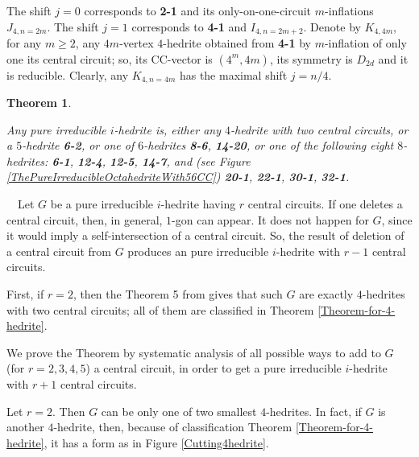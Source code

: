 \documentclass[12pt]{article}
\newtheorem{theorem}{Theorem}
\newcommand{\proof}{\noindent{\bf Proof.}\ \ }
\begin{document}
The shift $j=0$ corresponds to {\bf 2-1} and its only-on-one-circuit
$m$-inflations $J_{4,n=2m}$. The shift $j=1$ corresponds to {\bf 4-1} and 
$I_{4,n=2m+2}$.
Denote by $K_{4,4m}$, for any $m \ge 2$, any $4m$-vertex $4$-hedrite obtained
from {\bf 4-1} by $m$-inflation of only one its central circuit; so, its 
CC-vector is $(4^m,4m)$, its symmetry is $D_{2d}$ and it is reducible.
Clearly, any $K_{4,n=4m}$ has the maximal shift $j=n/4$.




%







\begin{theorem}\label{TheOneWithSimpleCentralCircuit}

Any pure irreducible $i$-hedrite is, either any $4$-hedrite with two
central circuits, or a $5$-hedrite {\bf 6-2}, or one of $6$-hedrites
{\bf 8-6}, {\bf 14-20}, or one of the following eight $8$-hedrites:
{\bf 6-1}, {\bf 12-4}, {\bf 12-5}, {\bf 14-7}, and (see Figure 
\ref{ThePureIrreducibleOctahedriteWith56CC}) {\bf 20-1}, {\bf 22-1},
{\bf 30-1}, {\bf 32-1}.


\end{theorem}


\proof Let $G$ be a pure irreducible $i$-hedrite having $r$ central circuits. 
If one deletes a central circuit, then, in general, $1$-gon can appear. It 
does not happen for $G$, since it would imply a self-intersection of a central 
circuit. So, the result of deletion of a central circuit from $G$ 
produces an pure irreducible $i$-hedrite with $r-1$ central circuits.

First, if $r=2$, then the Theorem 5 from \cite{DSt} gives that such $G$ are 
exactly $4$-hedrites with two central circuits; all of them are classified 
in Theorem \ref{Theorem-for-4-hedrite}.

We prove the Theorem by systematic analysis of all possible ways to add 
to $G$ (for $r=2,3,4,5$) a central circuit, in order to get a pure 
irreducible $i$-hedrite with $r+1$ central circuits. 


Let $r=2$. Then $G$ can be only one of two smallest $4$-hedrites. In 
fact, if $G$ is another $4$-hedrite, then, because of classification Theorem 
\ref{Theorem-for-4-hedrite}, it has a form as in Figure \ref{Cutting4hedrite}.
\end{document}
